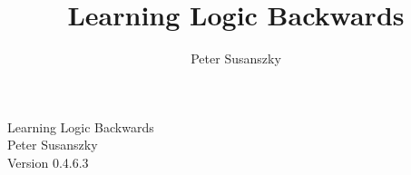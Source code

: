 \documentclass[12pt]{book}
\author{Peter Susanszky}
\title{Learning Logic Backwards}
\date{}
\begin{document}
\setcounter{page}{0}


\frontmatter

\noindent
Learning Logic Backwards\\
Peter Susanszky\\
Version 0.4.6.3
\doclicenseThis

\tableofcontents

\mainmatter












\end{document}
